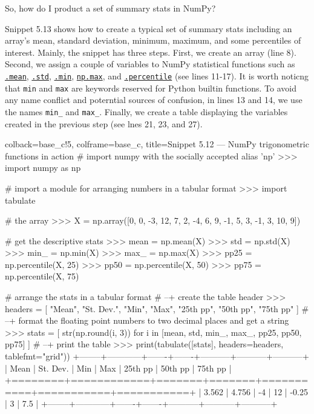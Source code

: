 \documentclass[a4paper,11pt]{book}
\numberwithin{figure}{chapter}
\numberwithin{table}{chapter}
\newcommand{\question}[1]{%
    \begin{tcolorbox}[colback=comp_c!10,colframe=comp_c,sidebyside align=top,width=\linewidth,before skip=1ex]
        #1
    \end{tcolorbox}
    \switchcolumn%
}
\newcommand{\note}[1]{%
    \begin{tcolorbox}[colback=white!0,colframe=white!10,width=\linewidth,before skip=1ex]
        #1
    \end{tcolorbox}
}
\begin{document}
\clearpage
\begin{paracol}{2}
	\question{\raggedright So, how do I product a set of summary stats in NumPy?}
	\note{Snippet 5.13 shows how to create a typical set of summary stats including an array's mean, standard deviation, minimum, maximum, and some percentiles of interest. Mainly, the snippet has three steps. First, we create an array (line 8). Second, we assign a couple of variables to NumPy statistical functions such as \href{https://numpy.org/doc/stable/reference/generated/numpy.mean.html\#numpy.mean}{\texttt{.mean}}, \href{https://numpy.org/doc/stable/reference/generated/numpy.std.html\#numpy.std}{\texttt{.std}}, \href{https://numpy.org/doc/stable/reference/generated/numpy.ndarray.min.html}{\texttt{.min}}, \href{https://numpy.org/doc/stable/reference/generated/numpy.ndarray.max.html}{\texttt{np.max}}, and \href{https://numpy.org/doc/stable/reference/generated/numpy.percentile. html\#numpy.percentile}{\texttt{.percentile}} (see lines 11-17). It is worth noticng that \texttt{min} and \texttt{max} are keywords reserved for Python builtin functions. To avoid any name conflict and poterntial sources of confusion, in lines 13 and 14, we use the names \texttt{min\_} and \texttt{max\_}. Finally, we create a table displaying the variables created in the previous step (see lnes 21, 23, and 27).} 
\end{paracol}

\begin{pythoncode}[linenos=true,]{colback=base_c!5, colframe=base_c, title=\sffamily Snippet 5.12 --- NumPy trigonometric functions in action}
# import numpy with the socially accepted alias 'np'
>>> import numpy as np

# import a module for arranging numbers in a tabular format
>>> import tabulate

# the array 
>>> X = np.array([0, 0, -3, 12, 7, 2, -4, 6, 9, -1, 5, 3, -1, 3, 10, 9])

# get the descriptive stats
>>> mean = np.mean(X)
>>> std = np.std(X)
>>> min_ = np.min(X)
>>> max_ = np.max(X)
>>> pp25 = np.percentile(X, 25)
>>> pp50 = np.percentile(X, 50)
>>> pp75 = np.percentile(X, 75)

# arrange the stats in a tabular format
# --+ create the table header
>>> headers = [
	"Mean", "St. Dev.", "Min", "Max", "25th pp", "50th pp", "75th pp"
	]
# --+ format the floating point numbers to two decimal places and get a string 
>>> stats = [
	str(np.round(i, 3)) for i in [mean, std, min_, max_, pp25, pp50, pp75]
	]
# --+ print the table
>>> print(tabulate([stats], headers=headers, tablefmt="grid"))
+--------+------------+-------+-------+-----------+-----------+-----------+
|   Mean |   St. Dev. |   Min |   Max |   25th pp |   50th pp |   75th pp |
+========+============+=======+=======+===========+===========+===========+
|  3.562 |      4.756 |    -4 |    12 |     -0.25 |         3 |       7.5 |
+--------+------------+-------+-------+-----------+-----------+-----------+
\end{pythoncode}
\end{document}
